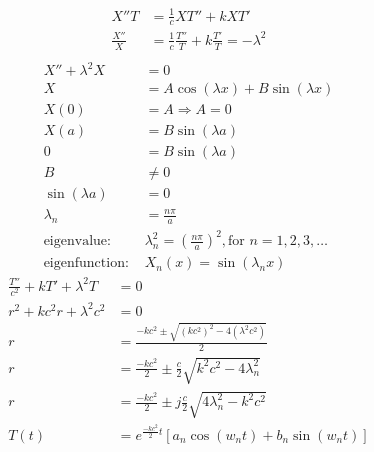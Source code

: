 \documentclass[../../HW06.tex]{subfiles}
\begin{document}
\begin{align*}
    X''T          & = \frac{1}{c}XT'' + kXT'                                  \\
    \frac{X''}{X} & = \frac{1}{c}\frac{T''}{T} + k\frac{T'}{T} = -\lambda^{2} \\
\end{align*}
\begin{align*}
    X'' + \lambda^{2}X     & = 0                                                                                  \\
    X                      & = A\cos(\lambda x) + B\sin(\lambda x)                                                \\
    X(0)                   & = A \Rightarrow A = 0                                                                \\
    X(a)                   & = B\sin(\lambda a)                                                                   \\
    0                      & = B\sin(\lambda a)                                                                   \\
    B                      & \ne 0                                                                                \\
    \sin(\lambda a)        & = 0                                                                                  \\
    \lambda_{n}            & = \frac{n\pi}{a}                                                                     \\
    \text{eigenvalue: }    & \lambda_{n}^{2} = \left(  \frac{n\pi}{a} \right)^{2}, \text{for } n = 1, 2, 3, \dots \\
    \text{eigenfunction: } & X_{n}(x) = \sin(\lambda_{n}x)
\end{align*}
\begin{align*}
    \frac{T''}{c^{2}} + kT' + \lambda^{2}T & = 0                                                                                         \\
    r^{2} + kc^{2}r + \lambda^{2}c^{2}     & = 0                                                                                         \\
    r                                      & = \frac{-kc^{2} \pm \sqrt{\left( kc^{2} \right)^{2} - 4\left( \lambda^{2}c^{2} \right)}}{2} \\
    r                                      & = \frac{-kc^{2}}{2} \pm \frac{c}{2}\sqrt{k^{2}c^{2} - 4\lambda_{n}^{2}}                     \\
    r                                      & = \frac{-kc^{2}}{2} \pm j \frac{c}{2} \sqrt{4\lambda_{n}^{2}-k^{2}c^{2}}                    \\
    T(t)                                   & = e^{\frac{-kc^{2}}{2}t}\left[ a_{n}\cos(w_{n}t) + b_{n}\sin(w_{n}t) \right]                \\
\end{align*}
\end{document}
